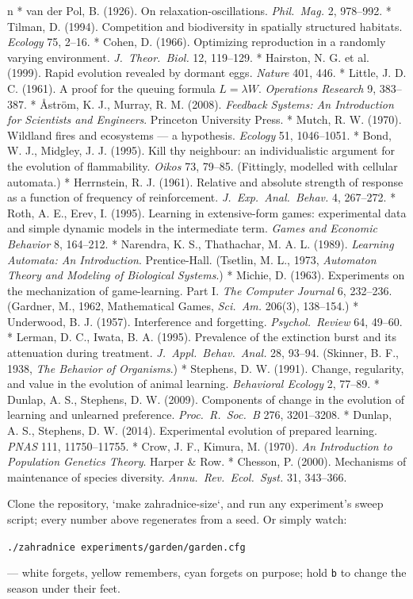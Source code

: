\begitems\style n
* van der Pol, B. (1926). On relaxation-oscillations. {\it Phil.\
Mag.} 2, 978--992.
* Tilman, D. (1994). Competition and biodiversity in spatially
structured habitats. {\it Ecology} 75, 2--16.
* Cohen, D. (1966). Optimizing reproduction in a randomly varying
environment. {\it J.\ Theor.\ Biol.} 12, 119--129.
* Hairston, N. G. et al. (1999). Rapid evolution revealed by
dormant eggs. {\it Nature} 401, 446.
* Little, J. D. C. (1961). A proof for the queuing formula
$L=\lambda W$. {\it Operations Research} 9, 383--387.
* Åström, K. J., Murray, R. M. (2008). {\it Feedback Systems: An
Introduction for Scientists and Engineers}. Princeton University
Press.
* Mutch, R. W. (1970). Wildland fires and ecosystems --- a
hypothesis. {\it Ecology} 51, 1046--1051.
* Bond, W. J., Midgley, J. J. (1995). Kill thy neighbour: an
individualistic argument for the evolution of flammability.
{\it Oikos} 73, 79--85. (Fittingly, modelled with cellular
automata.)
* Herrnstein, R. J. (1961). Relative and absolute strength of
response as a function of frequency of reinforcement. {\it J.\
Exp.\ Anal.\ Behav.} 4, 267--272.
* Roth, A. E., Erev, I. (1995). Learning in extensive-form games:
experimental data and simple dynamic models in the intermediate
term. {\it Games and Economic Behavior} 8, 164--212.
* Narendra, K. S., Thathachar, M. A. L. (1989). {\it Learning
Automata: An Introduction}. Prentice-Hall. (Tsetlin, M. L., 1973,
{\it Automaton Theory and Modeling of Biological Systems}.)
* Michie, D. (1963). Experiments on the mechanization of
game-learning. Part I. {\it The Computer Journal} 6, 232--236.
(Gardner, M., 1962, Mathematical Games, {\it Sci.\ Am.} 206(3),
138--154.)
* Underwood, B. J. (1957). Interference and forgetting. {\it
Psychol.\ Review} 64, 49--60.
* Lerman, D. C., Iwata, B. A. (1995). Prevalence of the extinction
burst and its attenuation during treatment. {\it J.\ Appl.\
Behav.\ Anal.} 28, 93--94. (Skinner, B. F., 1938, {\it The
Behavior of Organisms}.)
* Stephens, D. W. (1991). Change, regularity, and value in the
evolution of animal learning. {\it Behavioral Ecology} 2, 77--89.
* Dunlap, A. S., Stephens, D. W. (2009). Components of change in
the evolution of learning and unlearned preference. {\it Proc.\
R.\ Soc.\ B} 276, 3201--3208.
* Dunlap, A. S., Stephens, D. W. (2014). Experimental evolution of
prepared learning. {\it PNAS} 111, 11750--11755.
* Crow, J. F., Kimura, M. (1970). {\it An Introduction to
Population Genetics Theory}. Harper \& Row.
* Chesson, P. (2000). Mechanisms of maintenance of species
diversity. {\it Annu.\ Rev.\ Ecol.\ Syst.} 31, 343--366.
\enditems

\medskip
\noindent{\bf Reproduce it.} Clone the repository, `make
zahradnice-size`, and run any experiment's sweep script; every
number above regenerates from a seed. Or simply watch:
\medskip
\centerline{\tt ./zahradnice experiments/garden/garden.cfg}
\medskip
\noindent --- white forgets, yellow remembers, cyan forgets on
purpose; hold {\tt b} to change the season under their feet.

\bye
